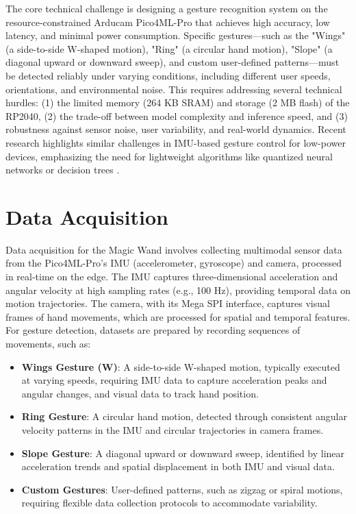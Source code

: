 The core technical challenge is designing a gesture recognition system on the resource-constrained Arducam Pico4ML-Pro that achieves high accuracy, low latency, and minimal power consumption. Specific gestures—such as the "Wings" (a side-to-side W-shaped motion), "Ring" (a circular hand motion), "Slope" (a diagonal upward or downward sweep), and custom user-defined patterns—must be detected reliably under varying conditions, including different user speeds, orientations, and environmental noise. This requires addressing several technical hurdles: (1) the limited memory (264 KB SRAM) and storage (2 MB flash) of the RP2040, (2) the trade-off between model complexity and inference speed, and (3) robustness against sensor noise, user variability, and real-world dynamics. Recent research highlights similar challenges in IMU-based gesture control for low-power devices, emphasizing the need for lightweight algorithms like quantized neural networks or decision trees \cite{Perumandla:2021, Garcia:2019, Sadiq:2022}.



\section{Data Acquisition}

Data acquisition for the Magic Wand involves collecting multimodal sensor data from the Pico4ML-Pro’s IMU (accelerometer, gyroscope) \cite{Din:2020} and camera, processed in real-time on the edge. The IMU captures three-dimensional acceleration and angular velocity at high sampling rates (e.g., 100 Hz), providing temporal data on motion trajectories. The camera, with its Mega SPI interface, captures visual frames of hand movements, which are processed for spatial and temporal features. For gesture detection, datasets are prepared by recording sequences of movements, such as:



\begin{itemize}

	\item \textbf{Wings Gesture (W)}: A side-to-side W-shaped motion, typically executed at varying speeds, requiring IMU data to capture acceleration peaks and angular changes, and visual data to track hand position.

	\item \textbf{Ring Gesture}: A circular hand motion, detected through consistent angular velocity patterns in the IMU and circular trajectories in camera frames.

	\item \textbf{Slope Gesture}: A diagonal upward or downward sweep, identified by linear acceleration trends and spatial displacement in both IMU and visual data.

	\item \textbf{Custom Gestures}: User-defined patterns, such as zigzag or spiral motions, requiring flexible data collection protocols to accommodate variability.

\end{itemize}



